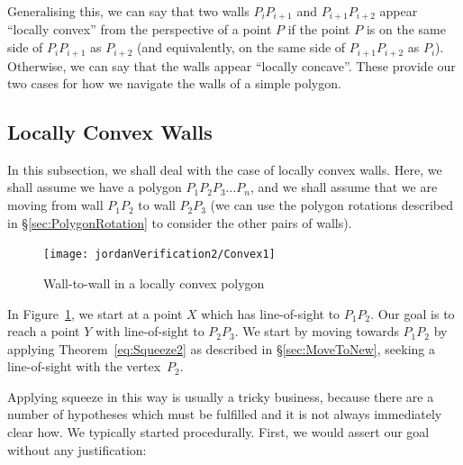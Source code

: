 Generalising this, we can say that two walls $P_{i}P_{i+1}$ and $P_{i+1}P_{i+2}$ appear ``locally convex'' from the perspective of a point $P$ if the point $P$ is on the same side of $P_{i}P_{i+1}$ as $P_{i+2}$ (and equivalently, on the same side of $P_{i+1}P_{i+2}$ as $P_{i}$). Otherwise, we can say that the walls appear ``locally concave''. These provide our two cases for how we navigate the walls of a simple polygon.

\subsection{Locally Convex Walls}\label{sec:ConcaveMove}
In this subsection, we shall deal with the case of locally convex walls. Here, we shall assume we have a polygon $P_1P_2P_3\ldots P_n$, and we shall assume that we are moving from wall $P_1P_2$ to wall $P_2P_3$ (we can use the polygon rotations described in \S\ref{sec:PolygonRotation} to consider the other pairs of walls).

\begin{figure}
\centering\texttt{[image: jordanVerification2/Convex1]}
\caption{Wall-to-wall in a locally convex polygon}
\label{fig:Convex1}
\end{figure}

In Figure~\ref{fig:Convex1}, we start at a point $X$ which has line-of-sight to $P_1P_2$. Our goal is to reach a point $Y$ with line-of-sight to $P_2P_3$. We start by moving towards $P_1P_2$ by applying Theorem~\ref{eq:Squeeze2} as described in \S\ref{sec:MoveToNew}, seeking a line-of-sight with the vertex~$P_2$. 

Applying squeeze in this way is usually a tricky business, because there are a number of hypotheses which must be fulfilled and it is not always immediately clear how. We typically started procedurally. First, we would assert our goal without any justification:


